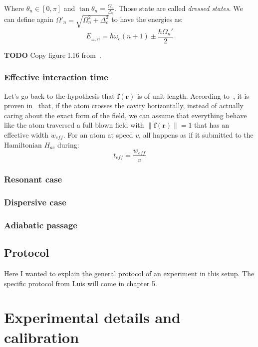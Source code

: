 \documentclass[10pt]{report}
\theoremstyle{plain}
\theoremstyle{definition}
\theoremstyle{remark}
\newcommand{\TODO}{\textbf{TODO}}
\newcommand{\bs}{\boldsymbol}
\begin{document}
\vspace{-0.5cm}

Where $\theta_n \in [0,\pi]$ and $\tan \theta_n = \frac {\Omega_n}{\Delta_c}$.
Those state are called \emph{dressed states}.
We can define again $\Omega'_n = \sqrt{\Omega_n^2 + \Delta_c^2}$ to have the energies as:
\[E_{\pm,n} = \hbar \omega_c(n+1) \pm \frac{\hbar \Omega_n'}2\]

\TODO{} Copy figure I.16 from~\cite{SayPHD11}.

\subsubsection{Effective interaction time}
\newcommand{\eff}{_{e\!f\!\!f}}

Let's go back to the hypothesis that $\bs f(\bs r)$ is of unit length. According
to~\cite{SayPHD11}, it is proven in~\cite{Har06} that, if the atom crosses the
cavity horizontally, instead of actually caring about the exact form of the
field, we can assume that everything behave like the atom traversed a full blown
field with $\|\bs f(\bs r)\| = 1$ that has an effective width $w\eff$. For an
atom at speed $v$, all happens as if it submitted to the Hamiltonian $H_{ac}$
during:
\[t\eff = \frac{w\eff}v\]

\subsubsection{Resonant case}

\subsubsection{Dispersive case}

\subsubsection{Adiabatic passage}

\subsection{Protocol}

Here I wanted to explain the general protocol of an experiment in this setup. The
specific protocol from Luis will come in chapter 5.



\section{Experimental details and calibration}
\end{document}
